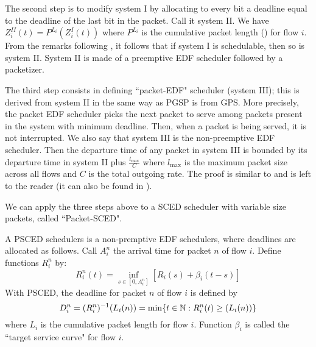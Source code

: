 The second step is to modify system I by allocating to every bit a
deadline equal to the deadline of the last bit in the packet. Call
it system II. We have $Z_i^{II}(t)=P^{L_i}(Z_i^{I}(t))$ where
$P^{L_i}$ is the cumulative packet length () for
flow $i$. From the remarks following , it follows
that if system I is schedulable, then so is system II. System II
is made of a preemptive EDF scheduler followed by a packetizer.

The third step consists in defining ``packet-EDF" scheduler
(system III); this is derived from system II in the same way as
PGSP is from GPS. More precisely, the packet EDF scheduler picks
the next packet to serve among packets present in the system with
minimum deadline. Then, when a packet is being served, it is not
interrupted. We also say that system III is the non-preemptive EDF
scheduler. Then the departure time of any packet in system III is
bounded by its departure time in system II plus
$\frac{l_{\max}}{C}$ where $l_{\max}$ is the maximum packet size
across all flows and $C$ is the total outgoing rate. The proof is
similar to  and is left to the reader (it can also
be found in \cite{Changbook}).

We can apply the three steps above to a SCED scheduler with
variable size packets, called ``Packet-SCED".
\begin{definition}
A PSCED schedulers is a non-premptive EDF schedulers, where
deadlines are allocated as follows. Call $A^n_i$ the arrival time
for packet $n$ of flow $i$. Define functions $R^n_i$ by:
$$
 R^n_i(t) = \inf_{s \in [0, A^n_i]} [R_i(s) + \beta_i (t-s)]
$$
With PSCED, the deadline for packet $n$ of flow $i$ is defined by
$$
D^n_i = ( R^n_i)^{-1}(L_i(n)) = \min \{t \in \mathbb{N} :  R^n_i(t)
\geq (L_i(n)) \}
$$
where $L_i$ is the cumulative packet length for flow $i$. Function
$\beta_i$ is called the ``target service curve" for flow $i$.
\end{definition}

